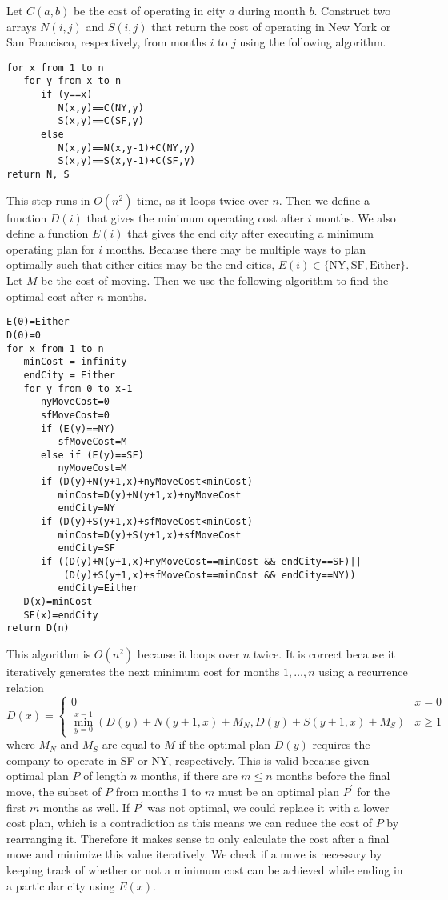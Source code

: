 \documentclass[12pt]{article}
\begin{document}
Let \(C(a,b)\) be the cost of operating in city \(a\) during month \(b\). Construct two arrays \(N(i,j)\) and \(S(i,j)\)
that return the cost of operating in New York or San Francisco, respectively, from months \(i\) to \(j\) using the following algorithm.
\begin{verbatim}
for x from 1 to n
   for y from x to n
      if (y==x)
         N(x,y)==C(NY,y)
         S(x,y)==C(SF,y)
      else
         N(x,y)==N(x,y-1)+C(NY,y)
         S(x,y)==S(x,y-1)+C(SF,y)
return N, S
\end{verbatim}
This step runs in \(O(n^2)\) time, as it loops twice over \(n\). Then we define a function \(D(i)\) that gives the minimum operating cost
after \(i\) months. We also define a function \(E(i)\) that gives the end city after executing a minimum operating plan for \(i\) months.
Because there may be multiple ways to plan optimally such that either cities may be the end cities,
\(E(i)\in\{\text{NY},\text{SF},\text{Either}\}\). Let \(M\) be the cost of moving. Then we use the following algorithm to find the
optimal cost after \(n\) months.
\begin{verbatim}
E(0)=Either
D(0)=0
for x from 1 to n
   minCost = infinity
   endCity = Either
   for y from 0 to x-1
      nyMoveCost=0
      sfMoveCost=0
      if (E(y)==NY)
         sfMoveCost=M
      else if (E(y)==SF)
         nyMoveCost=M
      if (D(y)+N(y+1,x)+nyMoveCost<minCost)
         minCost=D(y)+N(y+1,x)+nyMoveCost
         endCity=NY
      if (D(y)+S(y+1,x)+sfMoveCost<minCost)
         minCost=D(y)+S(y+1,x)+sfMoveCost
         endCity=SF
      if ((D(y)+N(y+1,x)+nyMoveCost==minCost && endCity==SF)||
          (D(y)+S(y+1,x)+sfMoveCost==minCost && endCity==NY))
         endCity=Either
   D(x)=minCost
   SE(x)=endCity
return D(n)
\end{verbatim}
This algorithm is \(O(n^2)\) because it loops over \(n\) twice. It is correct because it iteratively generates the next minimum cost for months \(1,\ldots,n\)
using a recurrence relation
\[D(x)=\begin{cases} 0 & x=0\\ \min\limits_{y=0}^{x-1} (D(y)+N(y+1,x)+M_N,D(y)+S(y+1,x)+M_S) & x\geq1 \end{cases}\]
where \(M_N\) and \(M_S\) are equal to \(M\) if the optimal plan \(D(y)\) requires the company to operate in SF or NY, respectively. This is valid because given
optimal plan \(P\) of length \(n\) months, if there are \(m\leq n\) months before the final move, the subset of \(P\) from months \(1\) to \(m\) must be an
optimal plan \(P^\prime\) for the first \(m\) months as well. If \(P^\prime\) was not optimal, we could replace it with a lower cost plan, which is a contradiction
as this means we can reduce the cost of \(P\) by rearranging it. Therefore it makes sense to only calculate the cost after a final move and minimize this value iteratively.
We check if a move is necessary by keeping track of whether or not a minimum cost can be achieved while ending in a particular city using \(E(x)\).
\end{document}
